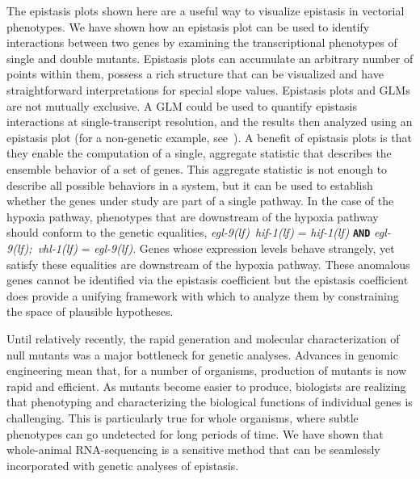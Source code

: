 \documentclass[9pt,twocolumn,twoside]{pnas-new}
\newcommand{\gene}[1]{\mbox{\emph{#1}}}
\newcommand{\egl}{\gene{egl-9(lf)}}
\newcommand{\eglvhl}{\gene{egl-9(lf); vhl-1(lf)}}
\newcommand{\eglhif}{\gene{egl-9(lf) hif-1(lf)}}
\newcommand{\hif}{\gene{hif-1(lf)}}
\begin{document}
The epistasis plots shown here are a useful way to visualize epistasis in
vectorial phenotypes. We have shown how an epistasis plot can be used to
identify interactions between two genes by examining the transcriptional
phenotypes of single and double mutants.
Epistasis plots can accumulate an
arbitrary number of points within them, possess a rich structure that can be
visualized and have straightforward interpretations for special slope values.
Epistasis plots and GLMs are not mutually exclusive. A GLM could be used to
quantify epistasis interactions at single-transcript resolution, and the results
then analyzed using an epistasis plot (for a non-genetic example,
see~\cite{Angeles-Albores2017a}).
A benefit of epistasis
plots is that they enable the computation of a single, aggregate statistic that
describes the ensemble behavior of a set of genes. This aggregate statistic
is not enough to describe all possible behaviors in a system, but it can be used
to establish whether the genes under study are part of a single pathway. In the
case of the hypoxia pathway, phenotypes that are downstream of the hypoxia
pathway should conform to the genetic equalities, \eglhif{} = \hif{}
\textbf{\texttt{AND}} \eglvhl{} = \egl{}. Genes whose expression levels behave
strangely, yet satisfy these equalities are downstream of the hypoxia pathway.
These anomalous genes cannot be identified via the epistasis coefficient but the
epistasis coefficient does provide a unifying framework with which to analyze
them by constraining the space of plausible hypotheses.
\color{black}

Until relatively recently, the rapid generation and molecular characterization
of null mutants was a major bottleneck for genetic analyses. Advances in
genomic engineering mean that, for a number of organisms, production of mutants
is now rapid and efficient. As mutants become easier to produce, biologists are
realizing that phenotyping and characterizing the biological functions of
individual genes is challenging. This is particularly true for whole organisms,
where subtle phenotypes can go undetected for long periods of time. We have
shown that whole-animal RNA-sequencing is a sensitive method that can be
seamlessly incorporated with genetic analyses of epistasis.
\end{document}
